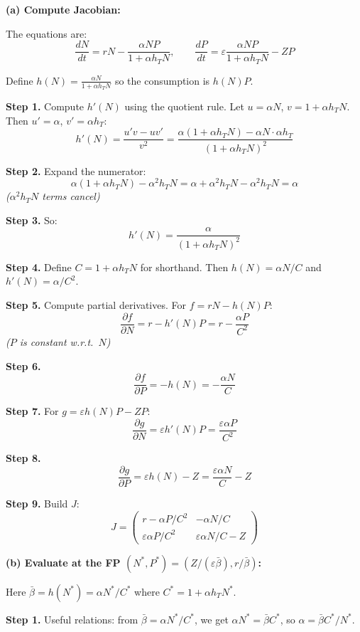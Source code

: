 \documentclass[10pt]{article}
\newcommand{\stepwhy}[1]{\textcolor{blue!60!black}{\small\textit{(#1)}}}
\begin{document}
\begin{solution}
\textbf{(a) Compute Jacobian:}

The equations are:
\[
\frac{dN}{dt} = rN - \frac{\alpha N P}{1+\alpha h_T N}, \qquad \frac{dP}{dt} = \varepsilon\frac{\alpha N P}{1+\alpha h_T N} - ZP
\]

Define $h(N) = \frac{\alpha N}{1+\alpha h_T N}$ so the consumption is $h(N)P$.

\textbf{Step 1.} Compute $h'(N)$ using the quotient rule. Let $u = \alpha N$, $v = 1+\alpha h_T N$. Then $u' = \alpha$, $v' = \alpha h_T$:
\[
h'(N) = \frac{u'v - uv'}{v^2} = \frac{\alpha(1+\alpha h_T N) - \alpha N\cdot\alpha h_T}{(1+\alpha h_T N)^2}
\]

\textbf{Step 2.} Expand the numerator:
\[
\alpha(1+\alpha h_T N) - \alpha^2 h_T N = \alpha + \alpha^2 h_T N - \alpha^2 h_T N = \alpha
\]
\stepwhy{$\alpha^2 h_T N$ terms cancel}

\textbf{Step 3.} So:
\[
h'(N) = \frac{\alpha}{(1+\alpha h_T N)^2}
\]

\textbf{Step 4.} Define $C = 1 + \alpha h_T N$ for shorthand. Then $h(N) = \alpha N/C$ and $h'(N) = \alpha/C^2$.

\textbf{Step 5.} Compute partial derivatives. For $f = rN - h(N)P$:
\[
\frac{\partial f}{\partial N} = r - h'(N) P = r - \frac{\alpha P}{C^2}
\]
\stepwhy{$P$ is constant w.r.t.\ $N$}

\textbf{Step 6.}
\[
\frac{\partial f}{\partial P} = -h(N) = -\frac{\alpha N}{C}
\]

\textbf{Step 7.} For $g = \varepsilon h(N) P - ZP$:
\[
\frac{\partial g}{\partial N} = \varepsilon h'(N) P = \frac{\varepsilon\alpha P}{C^2}
\]

\textbf{Step 8.}
\[
\frac{\partial g}{\partial P} = \varepsilon h(N) - Z = \frac{\varepsilon\alpha N}{C} - Z
\]

\textbf{Step 9.} Build $J$:
\[
J = \begin{pmatrix} r - \alpha P/C^2 & -\alpha N/C \\ \varepsilon\alpha P/C^2 & \varepsilon\alpha N/C - Z \end{pmatrix}
\]

\medskip\textbf{(b) Evaluate at the FP $(N^*, P^*) = (Z/(\varepsilon\bar\beta), r/\bar\beta)$:}

Here $\bar\beta = h(N^*) = \alpha N^*/C^*$ where $C^* = 1 + \alpha h_T N^*$.

\textbf{Step 1.} Useful relations: from $\bar\beta = \alpha N^*/C^*$, we get $\alpha N^* = \bar\beta C^*$, so $\alpha = \bar\beta C^*/N^*$.


\end{solution}
\end{document}
